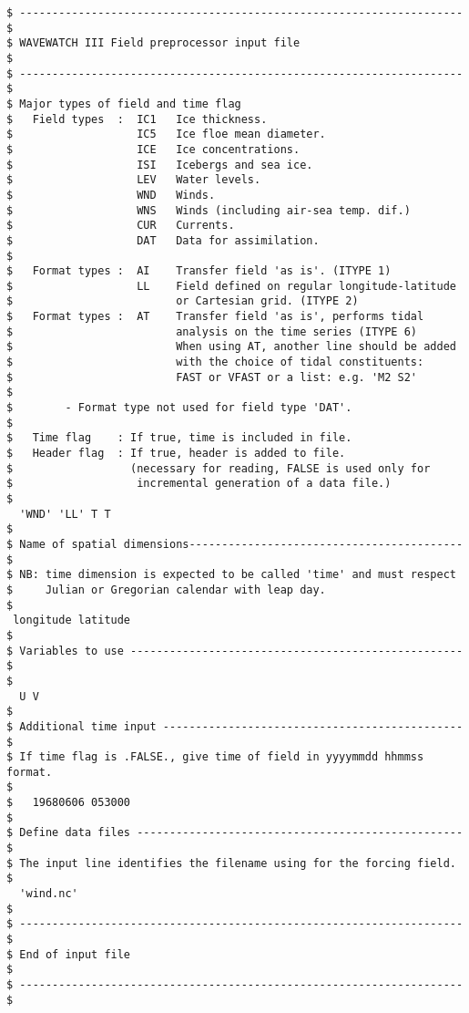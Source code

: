 \begin{footnotesize}
\begin{verbatim}
$ -------------------------------------------------------------------- $
$ WAVEWATCH III Field preprocessor input file                          $
$ -------------------------------------------------------------------- $
$ Major types of field and time flag
$   Field types  :  IC1   Ice thickness.
$                   IC5   Ice floe mean diameter.
$                   ICE   Ice concentrations.
$                   ISI   Icebergs and sea ice.
$                   LEV   Water levels.
$                   WND   Winds.
$                   WNS   Winds (including air-sea temp. dif.)
$                   CUR   Currents.
$                   DAT   Data for assimilation.
$
$   Format types :  AI    Transfer field 'as is'. (ITYPE 1)
$                   LL    Field defined on regular longitude-latitude
$                         or Cartesian grid. (ITYPE 2)
$   Format types :  AT    Transfer field 'as is', performs tidal 
$                         analysis on the time series (ITYPE 6)
$                         When using AT, another line should be added
$                         with the choice of tidal constituents:
$                         FAST or VFAST or a list: e.g. 'M2 S2'
$
$        - Format type not used for field type 'DAT'.
$
$   Time flag    : If true, time is included in file.
$   Header flag  : If true, header is added to file.
$                  (necessary for reading, FALSE is used only for
$                   incremental generation of a data file.)
$
  'WND' 'LL' T T
$
$ Name of spatial dimensions------------------------------------------ $
$ NB: time dimension is expected to be called 'time' and must respect 
$     Julian or Gregorian calendar with leap day.
$
 longitude latitude
$
$ Variables to use --------------------------------------------------- $
$
  U V
$
$ Additional time input ---------------------------------------------- $
$ If time flag is .FALSE., give time of field in yyyymmdd hhmmss format.
$
$   19680606 053000
$
$ Define data files -------------------------------------------------- $
$ The input line identifies the filename using for the forcing field.
$
  'wind.nc'
$
$ -------------------------------------------------------------------- $
$ End of input file                                                    $
$ -------------------------------------------------------------------- $
\end{verbatim}
\end{footnotesize}
